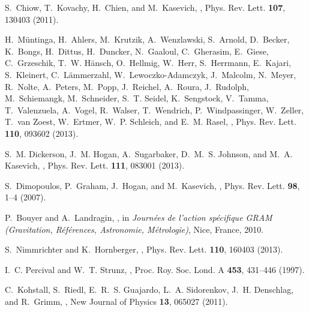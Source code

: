 \documentclass[12pt]{article}
\begin{document}
\begin{thebibliography}{100}
S.~Chiow, T.~Kovachy, H.~Chien, and M.~Kasevich,
,
\newblock Phys. Rev. Lett. {\bf 107}, 130403 (2011).

H.~Müntinga, H.~Ahlers, M.~Krutzik, A.~Wenzlawski, S.~Arnold, D.~Becker,
  K.~Bongs, H.~Dittus, H.~Duncker, N.~Gaaloul, C.~Gherasim, E.~Giese,
  C.~Grzeschik, T.~W. Hänsch, O.~Hellmig, W.~Herr, S.~Herrmann, E.~Kajari,
  S.~Kleinert, C.~Lämmerzahl, W.~Lewoczko-Adamczyk, J.~Malcolm, N.~Meyer,
  R.~Nolte, A.~Peters, M.~Popp, J.~Reichel, A.~Roura, J.~Rudolph,
  M.~Schiemangk, M.~Schneider, S.~T. Seidel, K.~Sengstock, V.~Tamma,
  T.~Valenzuela, A.~Vogel, R.~Walser, T.~Wendrich, P.~Windpassinger, W.~Zeller,
  T.~van Zoest, W.~Ertmer, W.~P. Schleich, and E.~M. Rasel,
,
\newblock Phys. Rev. Lett. {\bf 110}, 093602 (2013).

S.~M. Dickerson, J.~M. Hogan, A.~Sugarbaker, D.~M.~S. Johnson, and M.~A.
  Kasevich,
,
\newblock Phys. Rev. Lett. {\bf 111}, 083001 (2013).

S.~Dimopoulos, P.~Graham, J.~Hogan, and M.~Kasevich,
,
\newblock Phys. Rev. Lett. {\bf 98}, 1--4 (2007).

P.~Bouyer and A.~Landragin,
,
\newblock in {\em {Journ{\'e}es de l'action sp{\'e}cifique GRAM (Gravitation,
  R{\'e}f{\'e}rences, Astronomie, M{\'e}trologie)}}, Nice, France, 2010.

S.~Nimmrichter and K.~Hornberger,
,
\newblock Phys. Rev. Lett. {\bf 110}, 160403 (2013).

I.~C. Percival and W.~T. Strunz,
,
\newblock Proc. Roy. Soc. Lond. A {\bf 453}, 431--446 (1997).

C.~Kohstall, S.~Riedl, E.~R.~S. Guajardo, L.~A. Sidorenkov, J.~H. Denschlag,
  and R.~Grimm,
,
\newblock New Journal of Physics {\bf 13}, 065027 (2011).


\end{thebibliography}
\end{document}
